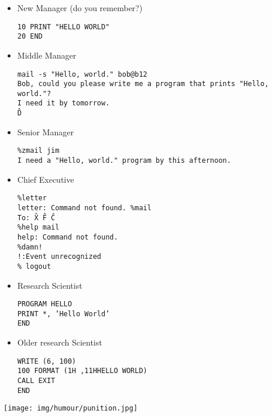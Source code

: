 \begin{itemize}
		\item New Manager (do you remember?)
	
	\texttt{10 PRINT "HELLO WORLD"\\
	20 END}
	
		\item Middle Manager
	
	\texttt{mail -s "Hello, world." bob@b12\\
	Bob, could you please write me a program that prints "Hello, world."?\\
	I need it by tomorrow.\\
	\^D\\}
	
		\item Senior Manager
	
	\texttt{\%zmail jim\\
	I need a "Hello, world." program by this afternoon.}
	
		\item Chief Executive
	
	\texttt{\%letter\\
	letter: Command not found.
	\%mail\\
	To: \^X \^F \^C\\
	\%help mail\\
	help: Command not found.\\
	\%damn!\\
	!:Event unrecognized\\
	\% logout\\}
	
		\item Research Scientist
	
	\texttt{PROGRAM HELLO\\
	PRINT *, 'Hello World'\\
	END}
	
		\item Older research Scientist
	
	\texttt{WRITE (6, 100)\\
	100 FORMAT (1H ,11HHELLO WORLD)\\
	CALL EXIT\\
	END}
	
	\end{itemize}

	\begin{center}\underline{\hspace{5 cm}}\end{center}	

	\begin{center}
		\texttt{[image: img/humour/punition.jpg]}
	\end{center}
	
